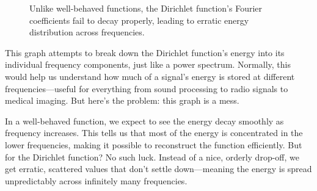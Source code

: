 \begin{figure}[H]
    \centering
    \caption{Unlike well-behaved functions, the Dirichlet function's Fourier coefficients fail to decay properly, leading to erratic energy distribution across frequencies.}
\end{figure}

This graph attempts to break down the Dirichlet function’s energy into its individual frequency components, just like a power spectrum. Normally, this would help us understand how much of a signal’s energy is stored at different frequencies—useful for everything from sound processing to radio signals to medical imaging. But here’s the problem: this graph is a mess.

In a well-behaved function, we expect to see the energy decay smoothly as frequency increases. This tells us that most of the energy is concentrated in the lower frequencies, making it possible to reconstruct the function efficiently. But for the Dirichlet function? No such luck. Instead of a nice, orderly drop-off, we get erratic, scattered values that don’t settle down—meaning the energy is spread unpredictably across infinitely many frequencies.

